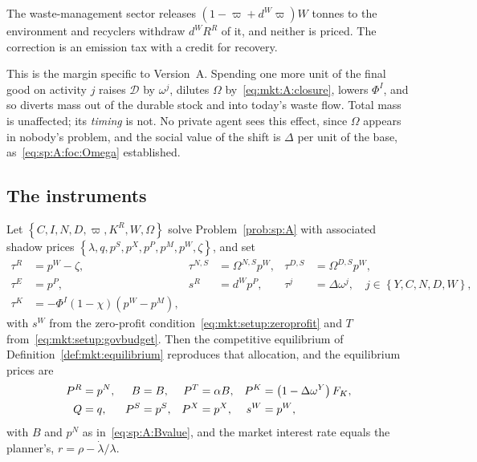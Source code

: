  The waste-management sector releases $\left(1-\varpi+d^W\varpi\right)W$
tonnes to the environment and recyclers withdraw $d^WR^R$ of it, and neither is priced. The correction
is an emission tax with a credit for recovery.

 This is the margin specific to Version~A.
Spending one more unit of the final good on activity $j$ raises $\mathcal D$ by $\omega^j$, dilutes
$\Omega$ by~\eqref{eq:mkt:A:closure}, lowers $\Phi^I$, and so diverts mass out of the durable stock and
into today's waste flow. Total mass is unaffected; its \emph{timing} is not. No private agent sees this
effect, since $\Omega$ appears in nobody's problem, and the social value of the shift is $\Delta$ per
unit of the base, as~\eqref{eq:sp:A:foc:Omega} established.


\subsection{The instruments}\label{sec:mkt:A:instruments}

\begin{proposition}\label{prop:mkt:A:implementation}
Let $\left\{C,I,N,D,\varpi,K^R,W,\Omega\right\}$ solve Problem~\ref{prob:sp:A} with associated shadow
prices $\left\{\lambda,q,p^S,p^X,p^P,p^M,p^W,\zeta\right\}$, and set
\begin{align}
\tau^R &= p^W-\zeta,
&
\tau^{N,S} &= \Omega^{N,S}p^W,
&
\tau^{D,S} &= \Omega^{D,S}p^W,
\label{eq:mkt:A:mass}
\\
\tau^E &= p^P,
&
s^R &= d^Wp^P,
&
\tau^j &= \Delta\omega^j,\quad j\in\left\{Y,C,N,D,W\right\},
\label{eq:mkt:A:emission}
\\
\tau^K &= -\Phi^I\left(1-\chi\right)\left(p^W-p^M\right),
&&&&
\label{eq:mkt:A:tauK}
\end{align}
with $s^W$ from the zero-profit condition~\eqref{eq:mkt:setup:zeroprofit} and $T$
from~\eqref{eq:mkt:setup:govbudget}. Then the competitive equilibrium of
Definition~\ref{def:mkt:equilibrium} reproduces that allocation, and the equilibrium prices are
\begin{align}
P^R &= p^N,
&
B &= B,
&
P^T &= \alpha B,
&
P^K &= \left(1-\Delta\omega^Y\right)F_K,
\notag\\
Q &= q,
&
P^S &= p^S,
&
P^X &= p^X,
&
s^W &= p^W,
\label{eq:mkt:A:prices}
\end{align}
with $B$ and $p^N$ as in~\eqref{eq:sp:A:Bvalue}, and the market interest rate
equals the planner's, $r=\rho-\dot\lambda/\lambda$.
\end{proposition}

